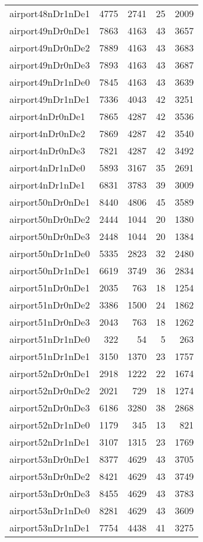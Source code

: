 \begin{longtable}{lrrrr}
airport48nDr1nDe1 & 4775 & 2741 & 25 & 2009 \\
airport49nDr0nDe1 & 7863 & 4163 & 43 & 3657 \\
airport49nDr0nDe2 & 7889 & 4163 & 43 & 3683 \\
airport49nDr0nDe3 & 7893 & 4163 & 43 & 3687 \\
airport49nDr1nDe0 & 7845 & 4163 & 43 & 3639 \\
airport49nDr1nDe1 & 7336 & 4043 & 42 & 3251 \\
airport4nDr0nDe1 & 7865 & 4287 & 42 & 3536 \\
airport4nDr0nDe2 & 7869 & 4287 & 42 & 3540 \\
airport4nDr0nDe3 & 7821 & 4287 & 42 & 3492 \\
airport4nDr1nDe0 & 5893 & 3167 & 35 & 2691 \\
airport4nDr1nDe1 & 6831 & 3783 & 39 & 3009 \\
airport50nDr0nDe1 & 8440 & 4806 & 45 & 3589 \\
airport50nDr0nDe2 & 2444 & 1044 & 20 & 1380 \\
airport50nDr0nDe3 & 2448 & 1044 & 20 & 1384 \\
airport50nDr1nDe0 & 5335 & 2823 & 32 & 2480 \\
airport50nDr1nDe1 & 6619 & 3749 & 36 & 2834 \\
airport51nDr0nDe1 & 2035 & 763 & 18 & 1254 \\
airport51nDr0nDe2 & 3386 & 1500 & 24 & 1862 \\
airport51nDr0nDe3 & 2043 & 763 & 18 & 1262 \\
airport51nDr1nDe0 & 322 & 54 & 5 & 263 \\
airport51nDr1nDe1 & 3150 & 1370 & 23 & 1757 \\
airport52nDr0nDe1 & 2918 & 1222 & 22 & 1674 \\
airport52nDr0nDe2 & 2021 & 729 & 18 & 1274 \\
airport52nDr0nDe3 & 6186 & 3280 & 38 & 2868 \\
airport52nDr1nDe0 & 1179 & 345 & 13 & 821 \\
airport52nDr1nDe1 & 3107 & 1315 & 23 & 1769 \\
airport53nDr0nDe1 & 8377 & 4629 & 43 & 3705 \\
airport53nDr0nDe2 & 8421 & 4629 & 43 & 3749 \\
airport53nDr0nDe3 & 8455 & 4629 & 43 & 3783 \\
airport53nDr1nDe0 & 8281 & 4629 & 43 & 3609 \\
airport53nDr1nDe1 & 7754 & 4438 & 41 & 3275 \\

\end{longtable}
